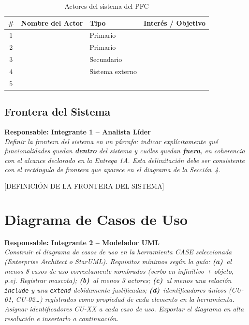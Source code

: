 \documentclass[journal,onecolumn]{IEEEtran}
\newcommand{\guia}[2]{%
  \begin{mdframed}[style=guia]
    \noindent\textbf{Responsable: #1}\\[2pt]
    \textit{#2}
  \end{mdframed}
}
\begin{document}
\begin{table}[H]
\caption{Actores del sistema del PFC}
\label{tab:actores}
\begin{tabularx}{\textwidth}{|c|X|l|X|}
\hline
\textbf{\#} & \textbf{Nombre del Actor} & \textbf{Tipo} & \textbf{Interés / Objetivo} \\
\hline
1 & & Primario & \\
\hline
2 & & Primario & \\
\hline
3 & & Secundario & \\
\hline
4 & & Sistema externo & \\
\hline
5 & & & \\
\hline
\end{tabularx}
\end{table}

\subsection{Frontera del Sistema}

\guia{Integrante 1 -- Analista Líder}{%
Definir la frontera del sistema en un párrafo: indicar explícitamente qué
funcionalidades quedan \textbf{dentro} del sistema y cuáles quedan
\textbf{fuera}, en coherencia con el alcance declarado en la Entrega 1A.
Esta delimitación debe ser consistente con el rectángulo de frontera
que aparece en el diagrama de la Sección~4.}

[DEFINICIÓN DE LA FRONTERA DEL SISTEMA]

\newpage

\section{Diagrama de Casos de Uso}

\guia{Integrante 2 -- Modelador UML}{%
Construir el diagrama de casos de uso en la herramienta CASE seleccionada
(Enterprise Architect o StarUML). Requisitos mínimos según la guía:
\textbf{(a)}~al menos 8 casos de uso correctamente nombrados
(verbo en infinitivo + objeto, p.ej. \textit{Registrar mascota});
\textbf{(b)}~al menos 3 actores;
\textbf{(c)}~al menos una relación \texttt{include} y una \texttt{extend}
debidamente justificadas;
\textbf{(d)}~identificadores únicos (CU-01, CU-02\ldots) registrados
como propiedad de cada elemento en la herramienta.
Asignar identificadores CU-XX a cada caso de uso.
Exportar el diagrama en alta resolución e insertarlo a continuación.}
\end{document}
